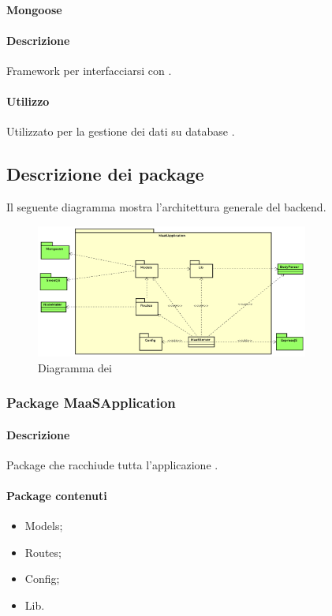 \paragraph{Mongoose}
\paragraph*{Descrizione}
Framework per interfacciarsi con .

\paragraph*{Utilizzo}
Utilizzato per la gestione dei dati su database .

\subsection{Descrizione dei package}
Il seguente diagramma mostra l'architettura generale del backend.
\begin{figure}[H]
\centering
\includegraphics[width=0.8\textwidth]{res/sections/backend/generale.png}
\caption{Diagramma dei }
\end{figure}

\subsubsection{Package MaaSApplication}
\paragraph*{Descrizione}
Package che racchiude tutta l'applicazione .

\paragraph*{Package contenuti}
\begin{itemize}
\item Models;
\item Routes;
\item Config;
\item Lib.
\end{itemize}

